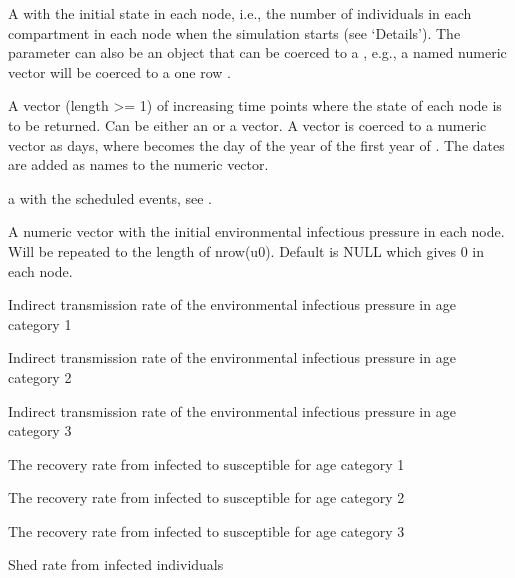 \documentclass[letterpaper]{book}
\begin{document}
\begin{Arguments}
\begin{ldescription}
\item[\code{u0}] A  with the initial state in each node,
i.e., the number of individuals in each compartment in each
node when the simulation starts (see `Details'). The
parameter  can also be an object that can be coerced
to a , e.g., a named numeric vector will be
coerced to a one row .

\item[\code{tspan}] A vector (length >= 1) of increasing time points
where the state of each node is to be returned. Can be either
an  or a  vector. A 
vector is coerced to a numeric vector as days, where
 becomes the day of the year of the first year
of . The dates are added as names to the numeric
vector.

\item[\code{events}] a  with the scheduled events, see
.

\item[\code{phi}] A numeric vector with the initial environmental
infectious pressure in each node. Will be repeated to the
length of nrow(u0). Default is NULL which gives 0 in each
node.

\item[\code{upsilon\_1}] Indirect transmission rate of the environmental
infectious pressure in age category 1

\item[\code{upsilon\_2}] Indirect transmission rate of the environmental
infectious pressure in age category 2

\item[\code{upsilon\_3}] Indirect transmission rate of the environmental
infectious pressure in age category 3

\item[\code{gamma\_1}] The recovery rate from infected to susceptible for
age category 1

\item[\code{gamma\_2}] The recovery rate from infected to susceptible for
age category 2

\item[\code{gamma\_3}] The recovery rate from infected to susceptible for
age category 3

\item[\code{alpha}] Shed rate from infected individuals


\end{ldescription}
\end{Arguments}
\end{document}
